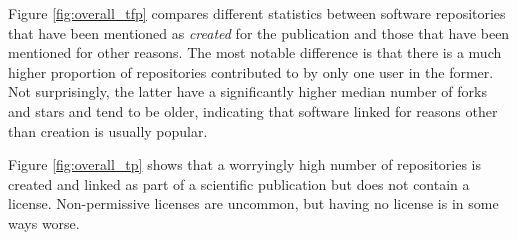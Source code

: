 \documentclass[10pt,a4paper]{scrartcl}
\begin{document}
Figure \ref{fig:overall_tfp} compares different statistics between software repositories that have been mentioned as \textit{created} for the publication
and those that have been mentioned for other reasons.
The most notable difference is that there is a much higher proportion of repositories contributed to by only one user in the former.
Not surprisingly, the latter have a significantly higher median number of forks and stars and tend to be older,
indicating that software linked for reasons other than creation is usually popular.

Figure \ref{fig:overall_tp} shows that a worryingly high number of repositories is created and linked as part of a scientific publication
but does not contain a license.
Non-permissive licenses are uncommon, but having no license is in some ways worse.
\end{document}
